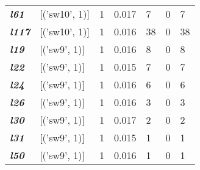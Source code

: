 \begin{table}
\begin{tabular}{lllllll}
    \textit{\textbf{l61}}                                           & {[}('sw10', 1){]} & 1                                 & 0.017                                  & 7                                  & 0                                  & 7                               \\
    \textit{\textbf{l117}}                                          & {[}('sw10', 1){]} & 1                                 & 0.016                                  & 38                                 & 0                                  & 38                              \\
    \textit{\textbf{l19}}                                           & {[}('sw9', 1){]}  & 1                                 & 0.016                                  & 8                                  & 0                                  & 8                               \\
    \textit{\textbf{l22}}                                           & {[}('sw9', 1){]}  & 1                                 & 0.015                                  & 7                                  & 0                                  & 7                               \\
    \textit{\textbf{l24}}                                           & {[}('sw9', 1){]}  & 1                                 & 0.016                                  & 6                                  & 0                                  & 6                               \\
    \textit{\textbf{l26}}                                           & {[}('sw9', 1){]}  & 1                                 & 0.016                                  & 3                                  & 0                                  & 3                               \\
    \textit{\textbf{l30}}                                           & {[}('sw9', 1){]}  & 1                                 & 0.017                                  & 2                                  & 0                                  & 2                               \\
    \textit{\textbf{l31}}                                           & {[}('sw9', 1){]}  & 1                                 & 0.015                                  & 1                                  & 0                                  & 1                               \\
    \textit{\textbf{l50}}                                           & {[}('sw9', 1){]}  & 1                                 & 0.016                                  & 1                                  & 0                                  & 1                               \\

\end{tabular}
\end{table}
